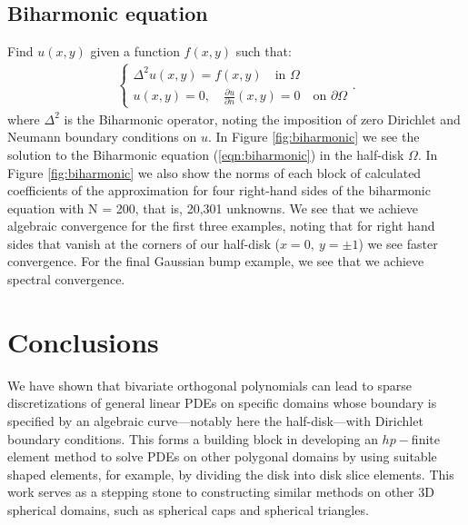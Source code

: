 \documentclass[11pt, oneside]{article}   	%
\begin{document}
\subsection{Biharmonic equation}

Find \(u(x,y)\) given a function \(f(x,y)\) such that:
\begin{align}
	\begin{cases}
    		\Delta^2 u(x,y) = f(x,y) \quad \text{in } \Omega \\
		u(x,y) = 0, \quad \frac{\partial u}{\partial n}(x,y) = 0 \quad \text{on } \partial \Omega
	\end{cases}.
	\label{eqn:biharmonic}
\end{align}
where $\Delta^2$ is the Biharmonic operator, noting the imposition of zero Dirichlet and Neumann boundary conditions on $u$. In Figure \ref{fig:biharmonic} we see the solution to the Biharmonic equation (\ref{eqn:biharmonic}) in the half-disk $\Omega$. In Figure \ref{fig:biharmonic} we also show the norms of each block of calculated coefficients of the approximation for four right-hand sides of the biharmonic equation with N = 200, that is, 20,301 unknowns.  We see that we achieve algebraic convergence for the first three examples, noting that for right hand sides that vanish at the corners of our half-disk ($x=0, \: y = \pm 1$) we see faster convergence. For the final Gaussian bump example, we see that we achieve spectral convergence.


%
\section{Conclusions}

We have shown that bivariate orthogonal polynomials can lead to sparse discretizations of general linear PDEs on specific domains whose boundary is specified by an algebraic curve---notably here the half-disk---with Dirichlet boundary conditions. This forms a building block in developing an $hp-$finite element method to solve PDEs on other polygonal domains by using suitable shaped elements, for example, by dividing the disk into disk slice elements. 
This work serves as a stepping stone to constructing similar methods on other 3D spherical domains, such as spherical caps and spherical triangles.
\end{document}
